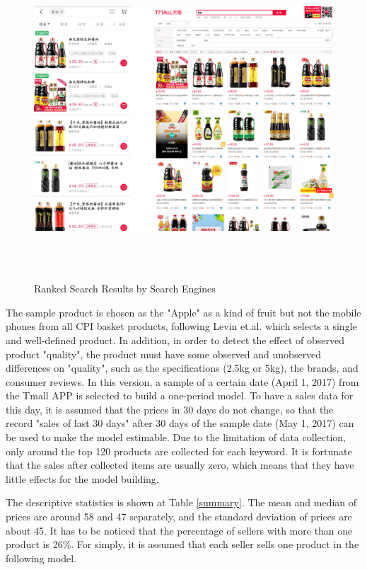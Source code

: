 \documentclass{article}
\begin{document}
\begin{figure}[H]
\centering
\includegraphics[width=16cm, height=12cm]{graphs/tmall.jpg}
\caption{\label{source}Ranked Search Results by Search Engines}
\end{figure} 

The sample product is chosen as the "Apple" as a kind of fruit but not the mobile phones from all CPI basket products, following Levin et.al. which selects a single and well-defined product. In addition, in order to detect the effect of observed product "quality", the product must have some observed and unobserved differences on "quality", such as the specifications (2.5kg or 5kg), the brands, and consumer reviews. 
In this version, a sample of a certain date (April 1, 2017) from the Tmall APP is selected to build a one-period model. To have a sales data for this day, it is assumed that the prices in 30 days do not change, so that the record "sales of last 30 days" after 30 days of the sample date (May 1, 2017) can be used to make the model estimable. Due to the limitation of data collection, only around the top 120 products are collected for each keyword. It is fortunate that the sales after collected items are usually zero, which means that they have little effects for the model building.   

The descriptive statistics is shown at Table \ref{summary}.  The mean and median of prices are around 58 and 47 separately, and the standard deviation of prices are about 45. It has to be noticed that the percentage of sellers with more than one product is 26\%. For simply, it is assumed that each seller sells one product in the following model. 
\end{document}
